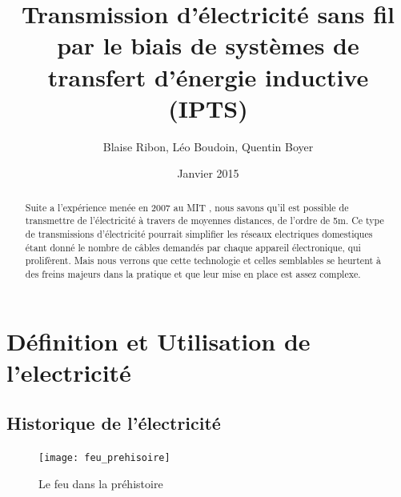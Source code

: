 \documentclass[12pt]{report}
\begin{document}

\title{Transmission d'électricité sans fil par le biais de systèmes de transfert d'énergie inductive (IPTS)}
\author{Blaise Ribon, Léo Boudoin, Quentin Boyer}
\date{Janvier 2015}
\maketitle

\begin{abstract}
	Suite a l'expérience menée en 2007 au MIT , nous savons qu'il est possible de transmettre de l'électricité à travers de moyennes distances, de l'ordre de 5m. Ce type de transmissions d'électricité pourrait simplifier les réseaux electriques domestiques étant donné le nombre de câbles demandés par chaque appareil électronique, qui prolifèrent. Mais nous verrons que cette technologie et celles semblables se heurtent à des freins majeurs dans la pratique et que leur mise en place est assez complexe.
\end{abstract}

\tableofcontents

\chapter{Définition et Utilisation de l'electricité} %
\section{Historique de l'électricité}

\begin{figure}[h!]
  \caption{Le feu dans la préhistoire}
  \centering
	\texttt{[image: feu\_prehisoire]}
\end{figure}
\end{document}
